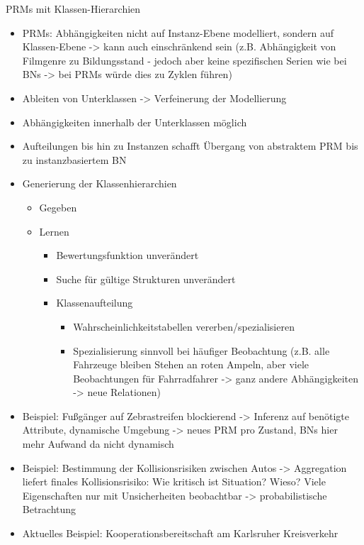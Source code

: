\documentclass[paper=a4, fontsize=11pt]{scrartcl} %
\numberwithin{equation}{section} %
\numberwithin{figure}{section} %
\numberwithin{table}{section} %
\begin{document}
PRMs mit Klassen-Hierarchien
\begin{itemize}
\item PRMs: Abhängigkeiten nicht auf Instanz-Ebene modelliert, sondern auf Klassen-Ebene -> kann auch einschränkend sein (z.B. Abhängigkeit von Filmgenre zu Bildungsstand - jedoch aber keine spezifischen Serien wie bei BNs -> bei PRMs würde dies zu Zyklen führen)
\item Ableiten von Unterklassen -> Verfeinerung der Modellierung
\item Abhängigkeiten innerhalb der Unterklassen möglich
\item Aufteilungen bis hin zu Instanzen schafft Übergang von abstraktem PRM bis zu instanzbasiertem BN
\item Generierung der Klassenhierarchien
\begin{itemize}
\item Gegeben
\item Lernen
\begin{itemize}
\item Bewertungsfunktion unverändert
\item Suche für gültige Strukturen unverändert
\item Klassenaufteilung
\begin{itemize}
\item Wahrscheinlichkeitstabellen vererben/spezialisieren
\item Spezialisierung sinnvoll bei häufiger Beobachtung (z.B. alle Fahrzeuge bleiben Stehen an roten Ampeln, aber viele Beobachtungen für Fahrradfahrer -> ganz andere Abhängigkeiten -> neue Relationen)
\end{itemize}
\end{itemize}
\end{itemize}
\item Beispiel: Fußgänger auf Zebrastreifen blockierend -> Inferenz auf benötigte Attribute, dynamische Umgebung -> neues PRM pro Zustand, BNs hier mehr Aufwand da nicht dynamisch
\item Beispiel: Bestimmung der Kollisionsrisiken zwischen Autos -> Aggregation liefert finales Kollisionsrisiko: Wie kritisch ist Situation? Wieso? Viele Eigenschaften nur mit Unsicherheiten beobachtbar -> probabilistische Betrachtung
\item Aktuelles Beispiel: Kooperationsbereitschaft am Karlsruher Kreisverkehr
\end{itemize}
\end{document}
